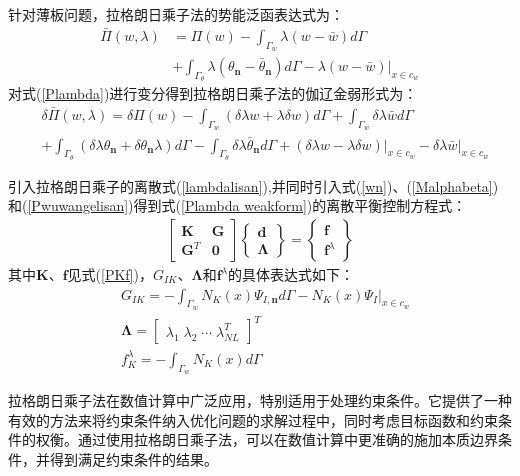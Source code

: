 针对薄板问题，拉格朗日乘子法的势能泛函表达式为：
\begin{equation}\label{Plambda}
\begin{split}
    \bar{\Pi}(w,\lambda)&=\Pi(w)-\int_{\Gamma_w}\lambda(w-\bar{w})d\Gamma\\
    &+\int_{\Gamma_{\theta}}\lambda(\theta_{\pmb n}-\bar{\theta}_{\pmb n})d\Gamma-\lambda(w-\bar{w})\vert_{x\in c_w}
\end{split}
\end{equation}
对式(\ref{Plambda})进行变分得到拉格朗日乘子法的伽辽金弱形式为：
\begin{equation}\label{Plambda weakform}
\begin{split}
    &\delta\bar{\Pi}(w,\lambda)=\delta\Pi(w)-\int_{\Gamma_w}(\delta\lambda w+\lambda\delta w)d\Gamma+\int_{\Gamma_w}\delta\lambda\bar{w}d\Gamma\\
&+\int_{\Gamma_{\theta}}(\delta\lambda\theta_{\pmb n}+\delta\theta_{\pmb n}\lambda)d\Gamma-\int_{\Gamma_{\theta}}\delta\lambda\bar{\theta}_{\pmb n}d\Gamma
+(\delta\lambda w-\lambda\delta w)\vert_{x\in c_w}-\delta\lambda\bar{w}\vert_{x\in c_w}
\end{split}
\end{equation}\par
引入拉格朗日乘子的离散式(\ref{lambdalisan}),并同时引入式(\ref{wn})、(\ref{Malphabeta})和(\ref{Pwuwangelisan})得到式(\ref{Plambda weakform})的离散平衡控制方程式：
\begin{equation}
\begin{split}
        \left[\begin{matrix}\pmb{K}&\pmb{G}\\\pmb{G}^T&\pmb{0}\end{matrix}\right]
        \left\{\begin{matrix}\pmb{d}\\\pmb{\Lambda}\end{matrix}\right\}=
        \left\{\begin{matrix}\pmb{f}\\\pmb{f}^{\lambda}\end{matrix}\right\}
\end{split}
\end{equation}
其中$\pmb{K}$、$\pmb{f}$见式(\ref{PKf})，$G_{IK}$、$\pmb{\Lambda}$和$\pmb{f}^{\lambda}$的具体表达式如下：
\begin{equation}
\begin{split}
    &G_{I\!K}=-\int_{\Gamma_w}N_K(x)\Psi_{I,\pmb n}d\Gamma-N_K(x)\Psi_I\vert_{x\in c_w}\\
    &\pmb{\Lambda}= \left[\begin{matrix}\lambda_1\;\lambda_2\;\dotsb\;\lambda_{NL}^T\end{matrix}\right]^T\\
    &f_K^{\lambda}=-\int_{\Gamma_w}N_K(x)d\Gamma
\end{split}
\end{equation}\par
拉格朗日乘子法在数值计算中广泛应用，特别适用于处理约束条件。它提供了一种有效的方法来将约束条件纳入优化问题的求解过程中，同时考虑目标函数和约束条件的权衡。通过使用拉格朗日乘子法，可以在数值计算中更准确的施加本质边界条件，并得到满足约束条件的结果。
